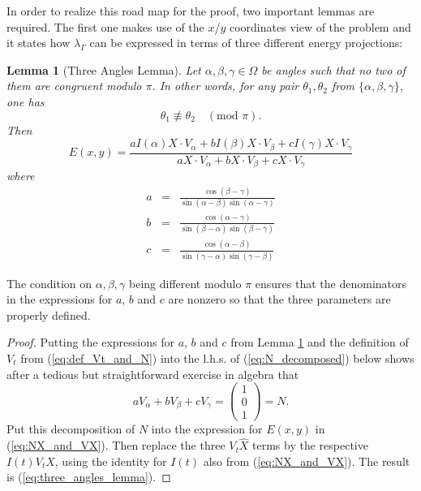 \documentclass{article}
\newtheorem{lemma}[definition]{Lemma}
\begin{document}
In order to realize this road map for the proof, two important lemmas are required. The first one makes use of the $x$/$y$ coordinates view of the problem and it states how $\lambda_\Gamma$ can be expressed in terms of three different energy projections:
\begin{lemma}[Three Angles Lemma] \label{lem:three_angles}
    Let $\alpha, \beta, \gamma \in \Omega$ be angles such that no two of them are congruent modulo $\pi$. In other words, for any pair $\theta_1, \theta_2$ from $\{\alpha, \beta, \gamma\}$, one has
    \[\theta_1 \not\equiv \theta_2 \quad (\text{mod }\pi).\]
    Then 
    \begin{equation} \label{eq:three_angles_lemma}
        E(x,y) = \frac{aI(\alpha) X \cdot V_\alpha + b I(\beta)X \cdot V_\beta + cI(\gamma) X \cdot V_\gamma}{a X \cdot V_\alpha + bX \cdot V_\beta + cX \cdot V_\gamma}
    \end{equation}
    where
    \begin{eqnarray*}
        a &=& \frac{\cos(\beta - \gamma)}{\sin(\alpha - \beta) \sin(\alpha-\gamma)}\\
        b &=& \frac{\cos(\alpha - \gamma)}{\sin(\beta - \alpha) \sin(\beta - \gamma)}\\
        c &=& \frac{\cos(\alpha - \beta)}{\sin(\gamma - \alpha) \sin(\gamma - \beta)}
    \end{eqnarray*}
\end{lemma}
The condition on $\alpha, \beta, \gamma$ being different modulo $\pi$ ensures that the denominators in the expressions for $a$, $b$ and $c$ are nonzero so that the three parameters are properly defined. %
\begin{proof}
    Putting the expressions for $a$, $b$ and $c$ from Lemma \ref{lem:three_angles} and the definition of $V_t$ from (\ref{eq:def_Vt_and_N}) into the l.h.s. of (\ref{eq:N_decomposed}) below shows after a tedious but straightforward exercise in algebra that
    \begin{equation}\label{eq:N_decomposed}
        a V_\alpha + bV_\beta + cV_\gamma =
        \begin{pmatrix}
            1\\
            0\\
            1
        \end{pmatrix}
        = N.
    \end{equation}
    Put this decomposition of $N$ into the expression for $E(x,y)$ in (\ref{eq:NX_and_VX}). Then replace the three $V_t\hat X$ terms by the respective $I(t)V_t X$, using the identity for $I(t)$ also from (\ref{eq:NX_and_VX}). The result is (\ref{eq:three_angles_lemma}).
\end{proof}
\end{document}
